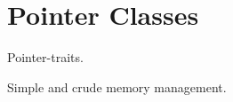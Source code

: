 
\chapter{Pointer Classes}
\label{sec:pointer}

Pointer-traits.

Simple and crude memory management.  

